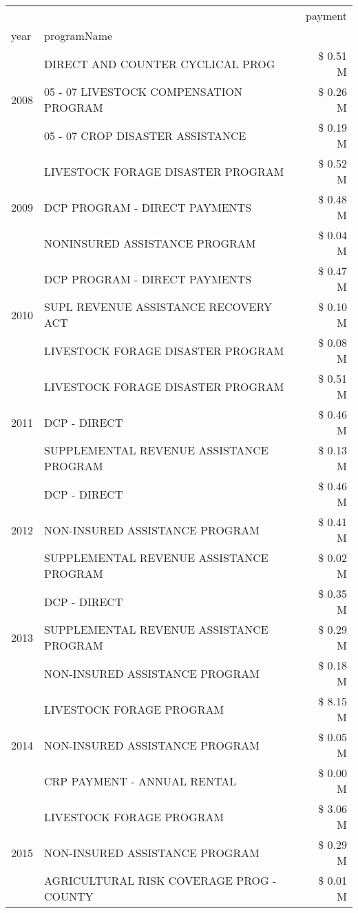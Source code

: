 \begin{tabular}{llr}
\toprule
 &  & payment \\
year & programName &  \\
\midrule
\multirow[t]{3}{*}{2008} & DIRECT AND COUNTER CYCLICAL PROG & \$ 0.51 M \\
 & 05 - 07 LIVESTOCK COMPENSATION PROGRAM & \$ 0.26 M \\
 & 05 - 07 CROP DISASTER ASSISTANCE & \$ 0.19 M \\
\cline{1-3}
\multirow[t]{3}{*}{2009} & LIVESTOCK FORAGE DISASTER  PROGRAM & \$ 0.52 M \\
 & DCP PROGRAM - DIRECT PAYMENTS & \$ 0.48 M \\
 & NONINSURED ASSISTANCE PROGRAM & \$ 0.04 M \\
\cline{1-3}
\multirow[t]{3}{*}{2010} & DCP PROGRAM - DIRECT PAYMENTS & \$ 0.47 M \\
 & SUPL REVENUE ASSISTANCE RECOVERY ACT & \$ 0.10 M \\
 & LIVESTOCK FORAGE DISASTER  PROGRAM & \$ 0.08 M \\
\cline{1-3}
\multirow[t]{3}{*}{2011} & LIVESTOCK FORAGE DISASTER PROGRAM & \$ 0.51 M \\
 & DCP - DIRECT & \$ 0.46 M \\
 & SUPPLEMENTAL REVENUE ASSISTANCE PROGRAM & \$ 0.13 M \\
\cline{1-3}
\multirow[t]{3}{*}{2012} & DCP - DIRECT & \$ 0.46 M \\
 & NON-INSURED ASSISTANCE PROGRAM & \$ 0.41 M \\
 & SUPPLEMENTAL REVENUE ASSISTANCE PROGRAM & \$ 0.02 M \\
\cline{1-3}
\multirow[t]{3}{*}{2013} & DCP - DIRECT & \$ 0.35 M \\
 & SUPPLEMENTAL REVENUE ASSISTANCE PROGRAM & \$ 0.29 M \\
 & NON-INSURED ASSISTANCE PROGRAM & \$ 0.18 M \\
\cline{1-3}
\multirow[t]{3}{*}{2014} & LIVESTOCK FORAGE PROGRAM & \$ 8.15 M \\
 & NON-INSURED ASSISTANCE PROGRAM & \$ 0.05 M \\
 & CRP PAYMENT - ANNUAL RENTAL & \$ 0.00 M \\
\cline{1-3}
\multirow[t]{3}{*}{2015} & LIVESTOCK FORAGE PROGRAM & \$ 3.06 M \\
 & NON-INSURED ASSISTANCE PROGRAM & \$ 0.29 M \\
 & AGRICULTURAL RISK COVERAGE PROG - COUNTY & \$ 0.01 M \\

\end{tabular}
